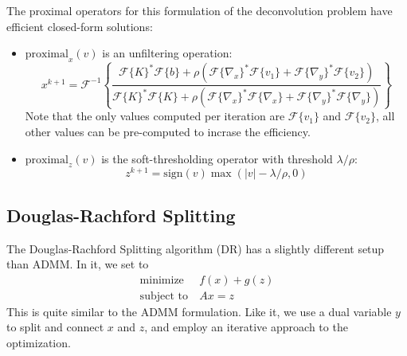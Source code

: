 \documentclass[sigconf]{acmart}
\begin{document}
The proximal operators for this formulation of the deconvolution problem have efficient closed-form solutions:

\begin{itemize}
    \item $\text{proximal}_x(v)$ is an unfiltering operation:
    $$x^{k+1} = \mathcal{F}^{-1}\left\{\frac{\mathcal{F}\{K\}^*\mathcal{F}\{b\} + \rho(\mathcal{F}\{\nabla_x\}^*\mathcal{F}\{v_1\} + \mathcal{F}\{\nabla_y\}^*\mathcal{F}\{v_2\})}{\mathcal{F}\{K\}^*\mathcal{F}\{K\} + \rho(\mathcal{F}\{\nabla_x\}^*\mathcal{F}\{\nabla_x\} + \mathcal{F}\{\nabla_y\}^*\mathcal{F}\{\nabla_y\})}\right\}$$
    Note that the only values computed per iteration are $\mathcal{F}\{v_1\}$ and $\mathcal{F}\{v_2\}$, all other values can be pre-computed to incrase the efficiency.
    \item $\text{proximal}_z(v)$ is the soft-thresholding operator with threshold $\lambda/\rho$:
    $$z^{k+1} = \text{sign}(v)\max(|v| - \lambda/\rho, 0)$$
\end{itemize}

\subsection{Douglas-Rachford Splitting}
The Douglas-Rachford Splitting algorithm (DR) has a slightly different setup than ADMM. In it, we set to 
\begin{align*}
  \text{minimize}~~ &f(x) + g(z)\\
  \text{subject to}~ &Ax = z
\end{align*}
This is quite similar to the ADMM formulation. Like it, we use a dual variable $y$ to split and connect $x$ and $z$, and employ an iterative approach to the optimization.
\end{document}
